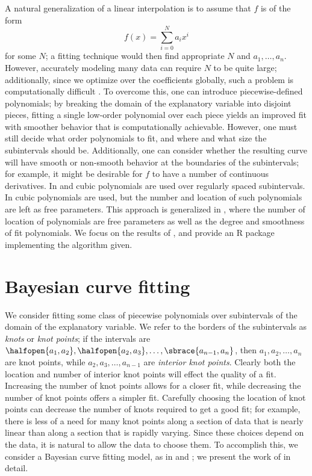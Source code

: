 \documentclass[12pt]{article}
\begin{document}
A natural generalization of a linear interpolation is to assume that
$f$ is of the form
\begin{equation*}
  f(x) = \sum_{i = 0}^N a_i x^i
\end{equation*}
for some $N$; a fitting technique would then find appropriate $N$ and
$a_1, \ldots, a_n$. However, accurately modeling many data can require
$N$ to be quite large; additionally, since we optimize over the
coefficients globally, such a problem is computationally difficult
\cite{denison1998automatic}. To overcome this, one can introduce
piecewise-defined polynomials; by breaking the domain of the
explanatory variable into disjoint pieces, fitting a single low-order
polynomial over each piece yields an improved fit with smoother
behavior that is computationally achievable. However, one must still
decide what order polynomials to fit, and where and what size the
subintervals should be. Additionally, one can consider whether the
resulting curve will have smooth or non-smooth behavior at the
boundaries of the subintervals; for example, it might be desirable for
$f$ to have a number of continuous derivatives. In \cite{akima1970new}
and \cite{inoue1986least} cubic polynomials are used over regularly
spaced subintervals. In \cite{dimatteo2001bayesian} cubic polynomials
are used, but the number and location of such polynomials are left as
free parameters. This approach is generalized in
\cite{denison1998automatic}, where the number of location of
polynomials are free parameters as well as the degree and smoothness
of fit polynomials. We focus on the results of
\cite{denison1998automatic}, and provide an R package implementing the
algorithm given.

\section{Bayesian curve fitting}

We consider fitting some class of piecewise polynomials over
subintervals of the domain of the explanatory variable. We refer to
the borders of the subintervals as \textit{knots} or \textit{knot
  points}; if the intervals are $\halfopen{a_1, a_2}, \halfopen{a_2,
  a_3}, \ldots, \sbrace{a_{n - 1}, a_n}$, then $a_1, a_2, \ldots, a_n$
are knot points, while $a_2, a_3, \ldots, a_{n - 1}$ are
\textit{interior knot points}. Clearly both the location and number of
interior knot points will effect the quality of a fit. Increasing the
number of knot points allows for a closer fit, while decreasing the
number of knot points offers a simpler fit. Carefully choosing the
location of knot points can decrease the number of knots required to
get a good fit; for example, there is less of a need for many knot
points along a section of data that is nearly linear than along a
section that is rapidly varying. Since these choices depend on the
data, it is natural to allow the data to choose them. To accomplish
this, we consider a Bayesian curve fitting model, as in
\cite{denison1998automatic} and \cite{dimatteo2001bayesian}; we
present the work of \cite{denison1998automatic} in detail.
\end{document}
